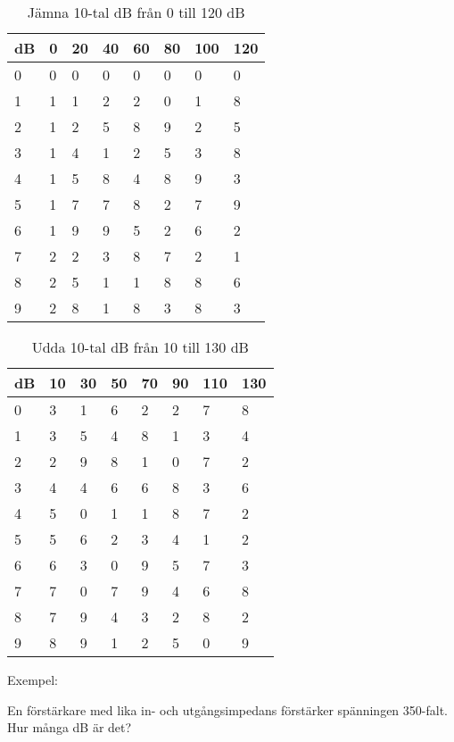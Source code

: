 \begin{table}[h]
  \caption{Jämna 10-tal dB från 0 till 120 dB}
  \label{tab:db-jämna-0-120}
  \begin{tabular}{l|lllllll}
    dB & 0 & 20 & 40 & 60 & 80 & 100 & 120 \\
    \hline
    0 & 0 & 0 & 0 & 0 & 0 & 0 & 0 \\
    1 & 1 & 1 & 2 & 2 & 0 & 1 & 8 \\
    2 & 1 & 2 & 5 & 8 & 9 & 2 & 5 \\
    3 & 1 & 4 & 1 & 2 & 5 & 3 & 8 \\
    4 & 1 & 5 & 8 & 4 & 8 & 9 & 3 \\
    5 & 1 & 7 & 7 & 8 & 2 & 7 & 9 \\
    6 & 1 & 9 & 9 & 5 & 2 & 6 & 2 \\
    7 & 2 & 2 & 3 & 8 & 7 & 2 & 1 \\
    8 & 2 & 5 & 1 & 1 & 8 & 8 & 6 \\
    9 & 2 & 8 & 1 & 8 & 3 & 8 & 3 \\
  \end{tabular}
\end{table}



\begin{table}[h]
  \caption{Udda 10-tal dB från 10 till 130 dB}
  \label{tab:db-udda-10-130}
  \begin{tabular}{l|lllllll}
    dB & 10 & 30 & 50 & 70 & 90 & 110 & 130 \\
    \hline
    0 & 3 & 1 & 6 & 2 & 2 & 7 & 8 \\
    1 & 3 & 5 & 4 & 8 & 1 & 3 & 4 \\
    2 & 2 & 9 & 8 & 1 & 0 & 7 & 2 \\
    3 & 4 & 4 & 6 & 6 & 8 & 3 & 6 \\
    4 & 5 & 0 & 1 & 1 & 8 & 7 & 2 \\
    5 & 5 & 6 & 2 & 3 & 4 & 1 & 2 \\
    6 & 6 & 3 & 0 & 9 & 5 & 7 & 3 \\
    7 & 7 & 0 & 7 & 9 & 4 & 6 & 8 \\
    8 & 7 & 9 & 4 & 3 & 2 & 8 & 2 \\
    9 & 8 & 9 & 1 & 2 & 5 & 0 & 9 \\
  \end{tabular}
\end{table}

Exempel:

En förstärkare med lika in- och utgångsimpedans förstärker spänningen
350-falt.  Hur många dB är det?

